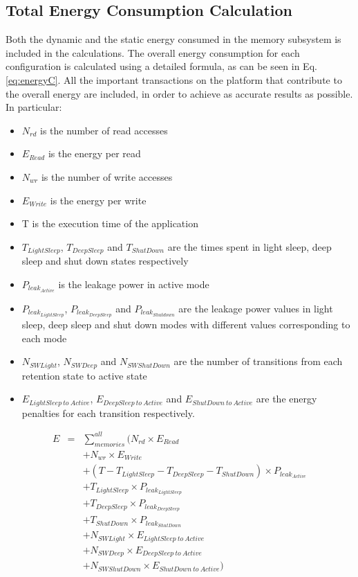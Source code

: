 \subsection{Total Energy Consumption Calculation}
Both the dynamic and the static energy consumed in the memory subsystem is included in the calculations.
The overall energy consumption for each configuration is calculated using a detailed formula, as can be seen in Eq.\ref{eq:energyC}. 
All the important transactions on the platform that contribute to the overall energy are included, in order to achieve as accurate results as possible. In particular:
\begin{itemize}
\item $N_{rd}$ is the number of read accesses
\item $E_{Read}$ is the energy per read
\item $N_{wr}$ is the number of write accesses 
\item $E_{Write}$ is the energy per write 
\item T is the execution time of the application
\item $T_{LightSleep}$, $T_{DeepSleep}$ and $T_{ShutDown}$ are the times spent in light sleep, deep sleep and shut down states respectively
\item $P_{leak_{Active}}$ is the leakage power in active mode 
\item $P_{leak_{LightSleep}}$, $P_{leak_{DeepSleep}}$ and $P_{leak_{Shutdown}}$ are the leakage power values in light sleep, deep sleep and shut down modes with different values corresponding to each mode 
\item $N_{SWLight}$, $N_{SWDeep}$ and $N_{SWShutDown}$ are the number of transitions from each retention state to active state
\item $E_{LightSleep \: to \: Active}$, $E_{DeepSleep \: to \: Active}$ and $E_{ShutDown \: to \: Active}$  are the energy penalties for each transition respectively.
\end{itemize}
\setlength{\arraycolsep}{0.0em}
\begin{eqnarray}
\label{eq:energyC}
 E &{}= {}&\sum\limits_{memories}^{all}  ( N_{rd} \times E_{Read} \nonumber\\
		&&+ N_{wr} \times E_{Write} \nonumber\\
		&&+ (T - T_{LightSleep} - T_{DeepSleep} - T_{ShutDown}) \times P_{leak_{Active}} \nonumber\\
		&&+ T_{LightSleep} \times P_{leak_{LightSleep}} \nonumber\\
		&&+ T_{DeepSleep} \times P_{leak_{DeepSleep}} \nonumber\\
		&&+ T_{ShutDown} \times P_{leak_{ShutDown}} \nonumber\\ 
		&& + N_{SWLight} \times E_{LightSleep \: to \: Active} \nonumber\\
		&& + N_{SWDeep} \times E_{DeepSleep \: to \: Active} \nonumber\\
		&& + N_{SWShutDown} \times E_{ShutDown \: to \: Active} ) \nonumber\\
\end{eqnarray}
